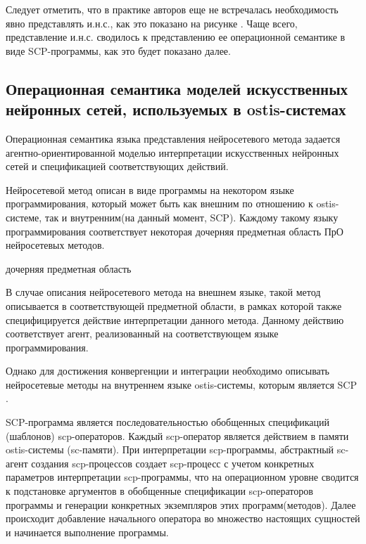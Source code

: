 Следует отметить, что в практике авторов еще не встречалась необходимость явно представлять и.н.с., как это показано на рисунке . Чаще всего, представление и.н.с. сводилось к представлению ее операционной семантике в виде SCP-программы, как это будет показано далее.

\subsection{Операционная семантика моделей искусственных нейронных сетей, используемых в ostis-системах}

Операционная семантика языка представления нейросетевого метода задается агентно-ориентированной моделью интерпретации искусственных нейронных сетей и спецификацией соответствующих действий.

Нейросетевой метод описан в виде программы на некотором языке программирования, который может быть как внешним по отношению к ostis-системе, так и внутренним(на данный момент, SCP). Каждому такому языку программирования соответствует некоторая дочерняя предметная область ПрО нейросетевых методов.

\begin{SCn}
	\begin{scnrelfromset}{дочерняя предметная область}
	\end{scnrelfromset}
\end{SCn}

В случае описания нейросетевого метода на внешнем языке, такой метод описывается в соответствующей предметной области, в рамках которой также специфицируется действие интерпретации данного метода. Данному действию соответствует агент, реализованный на соответствующем языке программирования.

Однако для достижения конвергенции и интеграции необходимо описывать нейросетевые методы на внутреннем языке ostis-системы, которым является SCP .

SCP-программа является последовательностью обобщенных спецификаций (шаблонов) scp-операторов. Каждый scp-оператор является действием в памяти ostis-системы (sc-памяти). При интерпретации scp-программы, абстрактный sc-агент создания scp-процессов создает scp-процесс с учетом конкретных параметров интерпретации scp-программы, что на операционном уровне сводится к подстановке аргументов в обобщенные спецификации scp-операторов программы и генерации конкретных экземпляров этих программ(методов). Далее происходит добавление начального оператора во множество настоящих сущностей и начинается выполнение программы.

